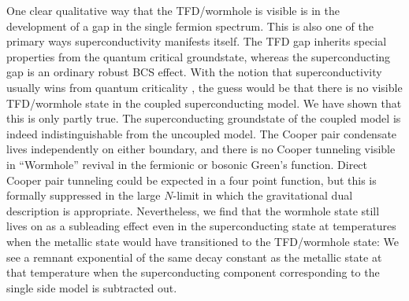 One clear qualitative way that the TFD/wormhole is visible is in the development of a gap in the single fermion spectrum. This is also one of the primary ways superconductivity manifests itself. The TFD gap inherits special properties from the quantum critical groundstate, whereas the superconducting gap is an ordinary robust BCS effect. With the notion that superconductivity usually wins from quantum criticality  \cite{metlitskiAreNonFermiliquidsStable2015}, the guess would be that there is no visible TFD/wormhole state in the coupled superconducting model.
We have shown that this is only partly true. The superconducting groundstate of the coupled model is indeed indistinguishable from the uncoupled model. The Cooper pair condensate lives independently on either boundary, and there is no Cooper tunneling visible in ``Wormhole'' revival in the fermionic or bosonic Green's function. Direct Cooper pair tunneling could be expected in a four point function, but this is formally suppressed in the large $N$-limit in which the gravitational dual description is appropriate.  Nevertheless, we find that the wormhole state still lives on as a subleading effect even in the superconducting state at temperatures when the metallic state would have transitioned to the TFD/wormhole state: We see a remnant exponential of the same decay constant as the metallic state at that temperature when the superconducting component corresponding to the single side model is subtracted out.
%


